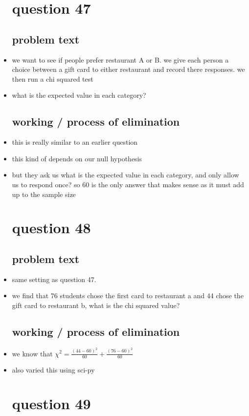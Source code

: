 \documentclass{article}
\begin{document}
\begin{itemize}
\section{question 47}
\subsection{problem text}
\item we want to see if people prefer restaurant A or B. we give each person a choice between a gift card to either restaurant and record there responses. we then run a chi squared test  
\item what is the expected value in each category?
\subsection{working / process of elimination }
\item this is really similar to an earlier question 
\item this kind of depends on our null hypothesis
\item but they ask us what is the expected value in each category, and only allow us to respond once? so 60 is the only answer that makes sense as it must add up to the sample size



\section{question 48}
\subsection{problem text}
\item same setting as question 47. 
\item we find that 76 students chose the first card to restaurant a and 44 chose the gift card to restaurant b, what is the chi squared value? 
\subsection{working / process of elimination }
\item we know that $\chi^2=\frac{(44-60)^2}{60}+\frac{(76-60)^2}{60}$
\item also varied this using sci-py

\section{question 49}

\end{itemize}
\end{document}
